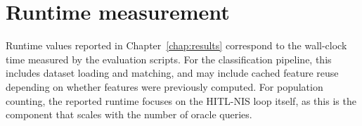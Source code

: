 \section{Runtime measurement}
Runtime values reported in Chapter~\ref{chap:results} correspond to the wall-clock time measured by the evaluation scripts. For the classification pipeline, this includes dataset loading and matching, and may include cached feature reuse depending on whether features were previously computed. For population counting, the reported runtime focuses on the HITL-NIS loop itself, as this is the component that scales with the number of oracle queries.